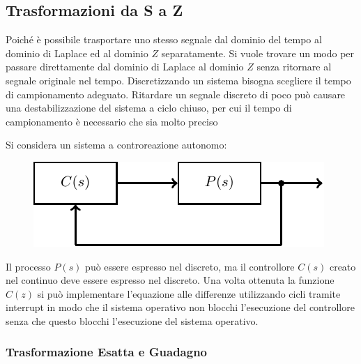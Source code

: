 \documentclass{article}
\numberwithin{equation}{subsection}
\begin{document}
\subsection{Trasformazioni da S a Z}

Poiché è possibile trasportare uno stesso segnale dal dominio del tempo al dominio di Laplace ed al dominio $Z$ separatamente. Si vuole trovare un modo per passare direttamente 
dal dominio di Laplace al dominio $Z$ senza ritornare al segnale originale nel tempo. Discretizzando un sistema bisogna scegliere il tempo di campionamento adeguato. Ritardare 
un segnale discreto di poco può causare una destabilizzazione del sistema a ciclo chiuso, per cui il tempo di campionamento è necessario che sia molto preciso 

Si considera un sistema a controreazione autonomo:
\begin{figure}[H]%
    \centering
    \includegraphics{controreazione-6.pdf}%
\end{figure}
Il processo $P(s)$ può essere espresso nel discreto, ma il controllore $C(s)$ creato nel continuo deve essere espresso nel discreto. 
Una volta ottenuta la funzione $C(z)$ si può implementare l'equazione alle differenze utilizzando cicli tramite interrupt in modo che il sistema operativo 
non blocchi l'esecuzione del controllore senza che questo blocchi l'esecuzione del sistema operativo. 

\subsubsection{Trasformazione Esatta e Guadagno}
\end{document}
